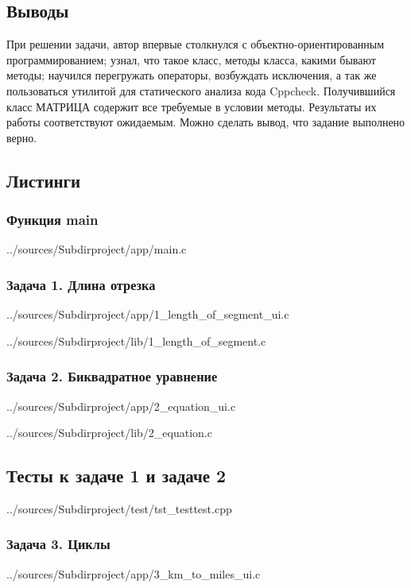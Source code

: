 \documentclass[12pt,a4paper]{report}
\begin{document}
\subsection{Выводы}
При решении задачи, автор впервые столкнулся с объектно-ориентированным программированием; узнал, что такое класс, методы класса, какими бывают методы; научился перегружать операторы, возбуждать исключения, а так же пользоваться утилитой для статического анализа кода Cppcheck. Получившийся класс МАТРИЦА содержит все требуемые в условии методы. Результаты их работы соответствуют ожидаемым. Можно сделать вывод, что задание выполнено верно. \\ 

\subsection*{Листинги}
\subsubsection{Функция main}

{../sources/Subdirproject/app/main.c}
\newpage

\subsubsection{Задача 1. Длина отрезка}

{../sources/Subdirproject/app/1_length_of_segment_ui.c}


{../sources/Subdirproject/lib/1_length_of_segment.c}
\newpage

\subsubsection{Задача 2. Биквадратное уравнение}

{../sources/Subdirproject/app/2_equation_ui.c}


{../sources/Subdirproject/lib/2_equation.c}
\newpage

\subsection{Тесты к задаче 1 и задаче 2}

{../sources/Subdirproject/test/tst_testtest.cpp}
\newpage

\subsubsection{Задача 3. Циклы}

{../sources/Subdirproject/app/3_km_to_miles_ui.c}
\end{document}

